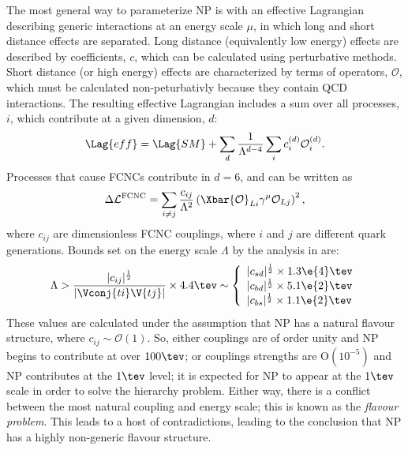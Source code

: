 The most general way to parameterize NP is with an effective Lagrangian describing generic
interactions at an energy scale $\mu$, in which long and short distance effects are separated.
Long distance (equivalently low energy) effects are described by coefficients, $c$, which can be
calculated using perturbative methods.
Short distance (or high energy) effects are characterized by terms of operators, $\mathcal{O}$,
which must be calculated non-peturbativly because they contain QCD interactions.
The resulting effective Lagrangian includes a sum over all processes, $i$, which contribute at a
given dimension, $d$:
\begin{equation}
  \Lag{eff}
  =
  \Lag{SM} + \sum_d\frac1{\Lambda^{d-4}}
  \sum_ic_i^{(d)}\mathcal{O}_i^{(d)}.
  \label{eq:th:lageff}
\end{equation}
Processes that cause FCNCs contribute in $d=6$, and can be written as
\begin{equation}
  \Delta\mathcal{L}^\mathrm{FCNC}
  =
  \sum_{i\neq j}\frac{c_{ij}}{\Lambda^2}
  \left(\Xbar{\mathcal{O}}_{Li}\gamma^\mu\mathcal{O}_{Lj}\right)^2,
\end{equation}
where $c_{ij}$ are dimensionless FCNC couplings, where $i$ and $j$ are different quark generations.
Bounds set on the energy scale $\Lambda$ by the analysis in  are:
\begin{equation}
  \Lambda > \frac{|c_{ij}|^\frac12}{|\Vconj{ti}\V{tj}|}\times4.4\tev
  \sim
  \left\{
    \begin{array}{l}
      |c_{sd}|^\frac12\times 1.3\e{4}\tev \\
      |c_{bd}|^\frac12\times 5.1\e{2}\tev \\
      |c_{bs}|^\frac12\times 1.1\e{2}\tev \\
    \end{array}\right.
\end{equation}
These values are calculated under the assumption that NP has a natural flavour structure, where
$c_{ij}\sim\mathcal{O}(1)$.
So, either couplings are of order unity and NP begins to contribute at over $100\tev$; or couplings
strengths are $\mathrm{O}(10^{-5})$ and NP contributes at the $1\tev$ level;
it is expected for NP to appear at the $1\tev$ scale in order to solve the hierarchy problem.
Either way, there is a conflict between the most natural coupling and energy scale; this is known
as the \emph{flavour problem}.
This leads to a host of contradictions, leading to the conclusion that NP has a highly non-generic
flavour structure.

